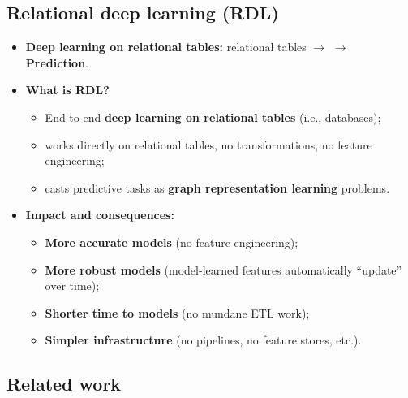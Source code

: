 \subsection{Relational deep learning (RDL)}\label{sec:lec12-rdl}

\begin{itemize}
  \item \textbf{Deep learning on relational tables:} relational tables $\to$
     $\to$ \textbf{Prediction}.
  \item \textbf{What is RDL?}
    \begin{itemize}
      \item End-to-end \textbf{deep learning on relational tables} (i.e., databases);
      \item works directly on relational tables, no transformations, no feature
        engineering;
      \item casts predictive tasks as \textbf{graph representation learning} problems.
    \end{itemize}
  \item \textbf{Impact and consequences:}
    \begin{itemize}
      \item \textbf{More accurate models} (no feature engineering);
      \item \textbf{More robust models} (model-learned features automatically ``update''
        over time);
      \item \textbf{Shorter time to models} (no mundane ETL work);
      \item \textbf{Simpler infrastructure} (no pipelines, no feature stores, etc.).
    \end{itemize}
\end{itemize}

\subsection{Related work}\label{sec:lec12-related}

